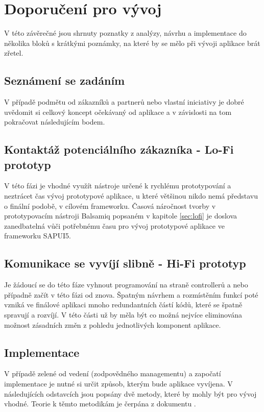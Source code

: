 \documentclass[thesis=M,czech]{FITthesis}[2012/06/26]
\begin{document}
\section{Doporučení pro vývoj}
V této závěrečné jsou shrnuty poznatky z analýzy, návrhu a implementace do několika bloků s krátkými poznámky, na které by se mělo při vývoji aplikace brát zřetel.

\subsection{Seznámení se zadáním}
V případě podmětu od zákazníků a partnerů nebo vlastní iniciativy je dobré uvědomit si celkový koncept očekávaný od aplikace a v závislosti na tom pokračovat následujícím bodem.

\subsection{Kontaktáž potenciálního zákazníka - Lo-Fi prototyp}
V této fázi je vhodné využít nástroje určené k rychlému prototypování a neztrácet čas vývoj prototypové aplikace, u které většinou nikdo nemá představu o finální podobě, v cílovém frameworku. Časová náročnost tvorby v prototypovacím nástroji Balsamiq popsaném v kapitole \ref{sec:lofi} je doslova zanedbatelná vůči potřebnému času pro vývoj prototypové aplikace ve frameworku SAPUI5.

\subsection{Komunikace se vyvíjí slibně - Hi-Fi prototyp}
Je žádoucí se do této fáze vyhnout programování na straně controllerů a nebo případně začít v této fázi od znova. Špatným návrhem a rozmístěním funkcí poté vzniká ve finálové aplikaci mnoho redundantních částí kódů, které se špatně spravují a rozvíjí. V této části už by měla být co možná nejvíce eliminována možnost zásadních změn z pohledu jednotlivých komponent aplikace. 

\subsection{Implementace}
V případě zelené od vedení (zodpovědného managementu) a započatí implementace je nutné si určit způsob, kterým bude aplikace vyvíjena. V následujících odstavcích jsou popsány dvě metody, které by mohly být pro vývoj vhodné. Teorie k těmto metodikám je čerpána z dokumentu \cite{prototyping}. 
\end{document}
